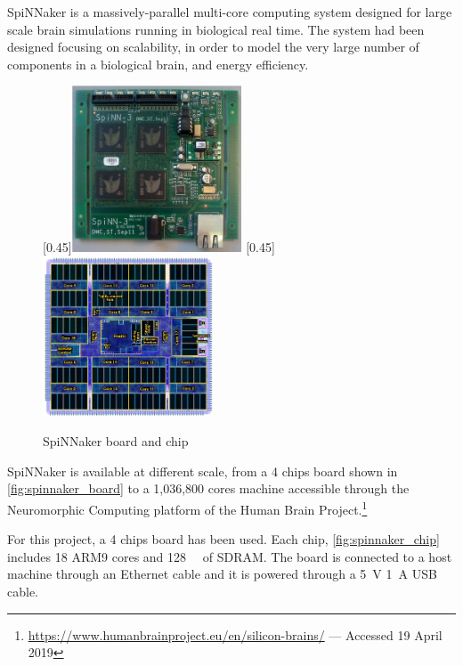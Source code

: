 SpiNNaker is a massively-parallel multi-core computing system designed for large scale brain simulations running in biological real time. The system had been designed focusing on scalability, in order to model the very large number of components in a biological brain, and energy efficiency.

\begin{figure}[ht]
\centering
{}
  [0.45\textwidth]{\includegraphics[width=0.45\textwidth]{images/context/spinnaker_board.png}}
  [0.45\textwidth]{\includegraphics[width=0.45\textwidth]{images/context/spinnaker_chip.png}}
\caption[SpiNNaker Board and Chip]{SpiNNaker board and chip}
\label{fig:spinnaker}
\end{figure}

SpiNNaker is available at different scale, from a 4 chips board shown in \cref{fig:spinnaker_board} to a 1,036,800 cores machine accessible through the Neuromorphic Computing platform of the Human Brain Project.\footnote{\url{https://www.humanbrainproject.eu/en/silicon-brains/} --- Accessed 19 April 2019}

For this project, a 4 chips board has been used. Each chip, \cref{fig:spinnaker_chip} includes 18 ARM9 cores and \SI{128}{\mega\byte} of SDRAM. The board is connected to a host machine through an Ethernet cable and it is powered through a \SI{5}{\volt} \SI{1}{\ampere} USB cable.

